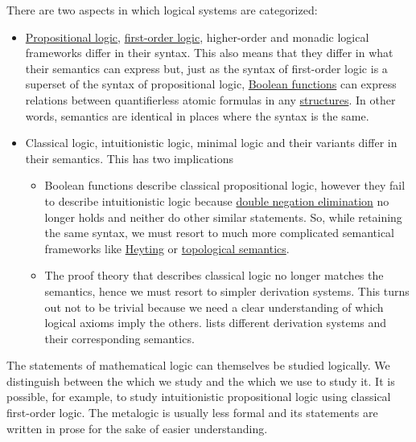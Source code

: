 There are two aspects in which logical systems are categorized:
\begin{itemize}
  \item \hyperref[subsec:propositional_logic]{Propositional logic}, \hyperref[subsec:first_order_logic]{first-order logic}, higher-order and monadic logical frameworks differ in their syntax. This also means that they differ in what their semantics can express but, just as the syntax of first-order logic is a superset of the syntax of propositional logic, \hyperref[subsec:boolean_functions]{Boolean functions} can express relations between quantifierless atomic formulas in any \hyperref[def:first_order_structure]{structures}. In other words, semantics are identical in places where the syntax is the same.

  \item Classical logic, intuitionistic logic, minimal logic and their variants differ in their semantics. This has two implications
  \begin{itemize}
     \item Boolean functions describe classical propositional logic, however they fail to describe intuitionistic logic because \hyperref[eq:thm:minimal_propositional_negation_laws/dne]{double negation elimination} no longer holds and neither do other similar statements. So, while retaining the same syntax, we must resort to much more complicated semantical frameworks like \hyperref[def:propositional_heyting_valuation]{Heyting} or \hyperref[def:propositional_topological_valuation]{topological semantics}.

     \item The proof theory that describes classical logic no longer matches the semantics, hence we must resort to simpler derivation systems. This turns out not to be trivial because we need a clear understanding of which logical axioms imply the others.  lists different derivation systems and their corresponding semantics.
  \end{itemize}
\end{itemize}

The statements of mathematical logic can themselves be studied logically. We distinguish between the  which we study and the  which we use to study it. It is possible, for example, to study intuitionistic propositional logic using classical first-order logic. The metalogic is usually less formal and its statements are written in prose for the sake of easier understanding.

